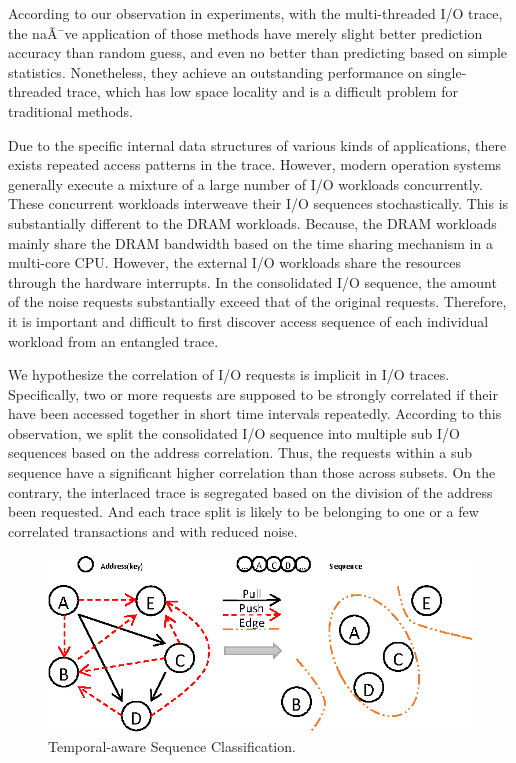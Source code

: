 According to our observation in experiments, with the multi-threaded I/O trace,
the naÃ¯ve application of those methods have merely slight better prediction accuracy than random guess,
and even no better than predicting based on simple statistics.
Nonetheless, they achieve an outstanding performance on single-threaded trace,
which has low space locality and is a difficult problem for traditional methods.

Due to the specific internal data structures of various kinds of applications,
there exists repeated access patterns in the trace.
However, modern operation systems generally execute a mixture of a large number of I/O workloads concurrently.
These concurrent workloads interweave their I/O sequences stochastically.
This is substantially different to the DRAM workloads.
Because, the DRAM workloads mainly share the DRAM bandwidth based on the time sharing mechanism in a multi-core CPU.
However, the external I/O workloads share the resources through the hardware interrupts.
In the consolidated I/O sequence, the amount of the noise requests substantially exceed that of the original requests.
Therefore, it is important and difficult to first discover access sequence of each individual workload from an entangled trace.

We hypothesize the correlation of I/O requests is implicit in I/O traces.
Specifically, two or more requests are supposed to be strongly correlated if their have been accessed together in short time intervals repeatedly.
According to this observation, we split the consolidated I/O sequence into multiple sub I/O sequences based on the address correlation.
Thus, the requests within a sub sequence have a significant higher correlation than those across subsets.
On the contrary, the interlaced trace is segregated based on the division of the address been requested.
And each trace split is likely to be belonging to one or a few correlated transactions and with reduced noise.
\fi

\begin{figure}[h]
\centering
\includegraphics[width=0.9\linewidth]{fig/sequence_grouping.eps}
\caption{Temporal-aware Sequence Classification.}
\label{fig:sequence_grouping}
\end{figure}

